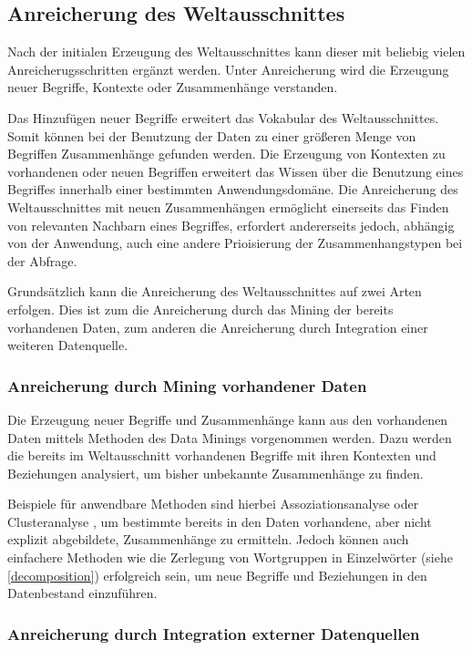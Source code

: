 \subsection{Anreicherung des Weltausschnittes}

Nach der initialen Erzeugung des Weltausschnittes kann dieser mit beliebig vielen Anreicherugsschritten ergänzt werden. Unter Anreicherung wird die Erzeugung neuer Begriffe, Kontexte oder Zusammenhänge verstanden.

Das Hinzufügen neuer Begriffe erweitert das Vokabular des Weltausschnittes. Somit können bei der Benutzung der Daten zu einer größeren Menge von Begriffen Zusammenhänge gefunden werden. Die Erzeugung von Kontexten zu vorhandenen oder neuen Begriffen erweitert das Wissen über die Benutzung eines Begriffes innerhalb einer bestimmten Anwendungsdomäne. Die Anreicherung des Weltausschnittes mit neuen Zusammenhängen ermöglicht einerseits das Finden von relevanten Nachbarn eines Begriffes, erfordert andererseits jedoch, abhängig von der Anwendung, auch eine andere Prioisierung der Zusammenhangstypen bei der Abfrage.

Grundsätzlich kann die Anreicherung des Weltausschnittes auf zwei Arten erfolgen. Dies ist zum die Anreicherung durch das Mining der bereits vorhandenen Daten, zum anderen die Anreicherung durch Integration einer weiteren Datenquelle.

\subsubsection{Anreicherung durch Mining vorhandener Daten}

Die Erzeugung neuer Begriffe und Zusammenhänge kann aus den vorhandenen Daten mittels Methoden des Data Minings vorgenommen werden. Dazu werden die bereits im Weltausschnitt vorhandenen Begriffe mit ihren Kontexten und Beziehungen analysiert, um bisher unbekannte Zusammenhänge zu finden.

Beispiele für anwendbare Methoden sind hierbei Assoziationsanalyse \cite[S. 328f.]{pt2013} oder Clusteranalyse \cite[S. 443f.]{hkp2012}, um bestimmte bereits in den Daten vorhandene, aber nicht explizit abgebildete, Zusammenhänge zu ermitteln. Jedoch können auch einfachere Methoden wie die Zerlegung von Wortgruppen in Einzelwörter (siehe \ref{decomposition}) erfolgreich sein, um neue Begriffe und Beziehungen in den Datenbestand einzuführen.

\subsubsection{Anreicherung durch Integration externer Datenquellen}

